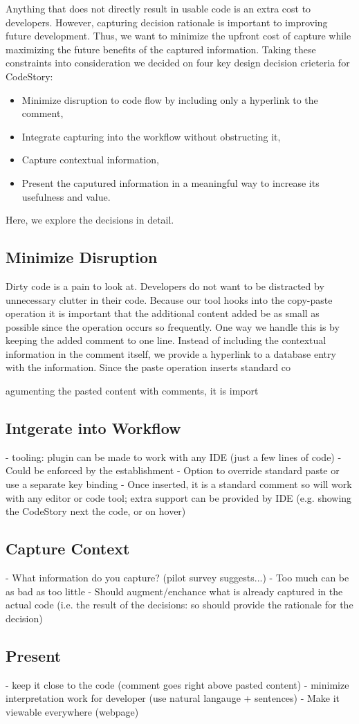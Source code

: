 \documentclass[../manifest.tex]{subfiles}
\begin{document}
Anything that does not directly result in usable code is an extra cost to developers. However, capturing decision rationale is important to improving future development. Thus, we want to minimize the upfront cost of capture while maximizing the future benefits of the captured information. Taking these constraints into consideration we decided on four key design decision crieteria for CodeStory:
\begin{itemize}
  \item Minimize disruption to code flow by including only a hyperlink to the comment,
  \item Integrate capturing into the workflow without obstructing it,
  \item Capture contextual information,
  \item Present the caputured information in a meaningful way to increase its usefulness and value.
\end{itemize}
Here, we explore the decisions in detail.

\subsection{Minimize Disruption}
  Dirty code is a pain to look at. Developers do not want to be distracted by unnecessary clutter in their code. Because our tool hooks into the copy-paste operation it is important that the additional content added be as small as possible since the operation occurs so frequently. One way we handle this is by keeping the added comment to one line. Instead of including the contextual information in the comment itself, we provide a hyperlink to a database entry with the information. Since the paste operation inserts standard co

  agumenting the pasted content with comments, it is import
\subsection{Intgerate into Workflow}
  - tooling: plugin can be made to work with any IDE (just a few lines of code)
  - Could be enforced by the establishment
  - Option to override standard paste or use a separate key binding
  - Once inserted, it is a standard comment so will work with any editor or code tool; extra support
  can be provided by IDE (e.g. showing the CodeStory next the code, or on hover)
\subsection{Capture Context}
  - What information do you capture? (pilot survey suggests...)
  - Too much can be as bad as too little
  - Should augment/enchance what is already captured in the actual code (i.e. the result of the decisions: so should provide the rationale for the decision)
\subsection{Present}
  - keep it close to the code (comment goes right above pasted content)
  - minimize interpretation work for developer (use natural langauge + sentences)
  - Make it viewable everywhere (webpage)
\end{document}
